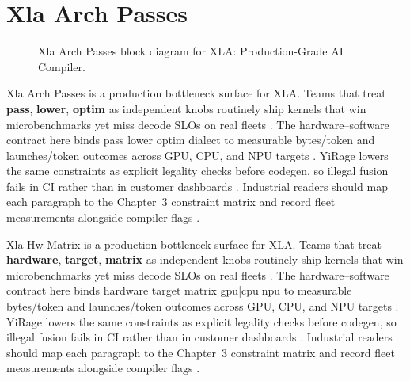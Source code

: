 \section{Xla Arch Passes}
\label{sec:xla_arch_passes}
\begin{figure}[t]
\centering
{}
\caption{Xla Arch Passes block diagram for XLA: Production-Grade AI Compiler.}
\label{fig:xla_arch_passes_architecture}
\end{figure}


Xla Arch Passes is a production bottleneck surface for XLA. Teams that treat \textbf{pass}, \textbf{lower}, \textbf{optim} as independent knobs routinely ship kernels that win microbenchmarks yet miss decode SLOs on real fleets \citep{taxbreak2026,semianalysis2024tma}. The hardware--software contract here binds pass lower optim dialect to measurable bytes/token and launches/token outcomes across GPU, CPU, and NPU targets \citep{memoryfloor2026,amd2024xdna}. YiRage lowers the same constraints as explicit legality checks before codegen, so illegal fusion fails in CI rather than in customer dashboards \citep{nvidia2022hopper,amd2024aie}. Industrial readers should map each paragraph to the Chapter~3 constraint matrix and record fleet measurements alongside compiler flags \citep{semianalysis2024tma,dlbook}.

Xla Hw Matrix is a production bottleneck surface for XLA. Teams that treat \textbf{hardware}, \textbf{target}, \textbf{matrix} as independent knobs routinely ship kernels that win microbenchmarks yet miss decode SLOs on real fleets \citep{liu2024deepseekv3,memoryfloor2026}. The hardware--software contract here binds hardware target matrix gpu|cpu|npu to measurable bytes/token and launches/token outcomes across GPU, CPU, and NPU targets \citep{patel2025llminference,nvidia2022hopper}. YiRage lowers the same constraints as explicit legality checks before codegen, so illegal fusion fails in CI rather than in customer dashboards \citep{taxbreak2026,semianalysis2024tma}. Industrial readers should map each paragraph to the Chapter~3 constraint matrix and record fleet measurements alongside compiler flags \citep{memoryfloor2026,amd2024xdna}.

